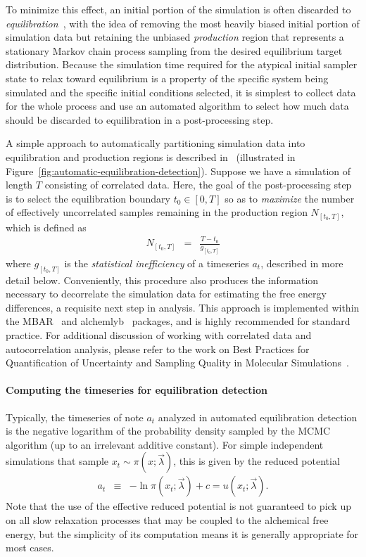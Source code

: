 \documentclass[9pt,bestpractices]{livecoms}
\begin{document}
%
To minimize this effect, an initial portion of the simulation is often discarded to \emph{equilibration}~\cite{braun2019best}, with the idea of removing the most heavily biased initial portion of simulation data but retaining the unbiased \emph{production} region that represents a stationary Markov chain process sampling from the desired equilibrium target distribution.
Because the simulation time required for the atypical initial sampler state to relax toward equilibrium is a property of the specific system being simulated and the specific initial conditions selected, it is simplest to collect data for the whole process and use an automated algorithm to select how much data should be discarded to equilibration in a post-processing step.

A simple approach to automatically partitioning simulation data into equilibration and production regions is described in~\cite{chodera2016simple} (illustrated in Figure~\ref{fig:automatic-equilibration-detection}).
Suppose we have a simulation of length $T$ consisting of correlated data.
Here, the goal of the post-processing step is to select the equilibration boundary $t_0 \in [0, T]$ so as to \emph{maximize} the number of effectively uncorrelated samples remaining in the production region $N_{[t_0,T]}$, which is defined as
\begin{eqnarray}
N_{[t_0,T]} &=& \frac{T - t_0}{g_{[t_0,T]}}
\end{eqnarray}
where $g_{[t_0,T]}$ is the \emph{statistical inefficiency} of a timeseries $a_t$, described in more detail below.
Conveniently, this procedure also produces the information necessary to decorrelate the simulation data for estimating the free energy differences, a requisite next step in analysis.
This approach is implemented within the MBAR~\cite{kylebeauchamp2019choderalab} and alchemlyb~\cite{daviddotson2019alchemistry} packages, and is highly recommended for standard practice.
%
For additional discussion of working with correlated data and autocorrelation analysis, please refer to the work on Best Practices for Quantification of Uncertainty and Sampling Quality in Molecular Simulations~\cite{grossfield2018best}.
%
\paragraph{Computing the timeseries for equilibration detection}
Typically, the timeseries of note $a_t$ analyzed in automated equilibration detection is the negative logarithm of the probability density sampled by the MCMC algorithm (up to an irrelevant additive constant).
For simple independent simulations that sample $x_t \sim \pi(x ; \vec{\lambda})$, this is given by the reduced potential
\begin{eqnarray}
a_t &\equiv& - \ln \pi(x_t; \vec{\lambda}) + c = u(x_t; \vec{\lambda}) .
\end{eqnarray}
%
Note that the use of the effective reduced potential is not guaranteed to pick up on all slow relaxation processes that may be coupled to the alchemical free energy, but the simplicity of its computation means it is generally appropriate for most cases.
%
\end{document}
